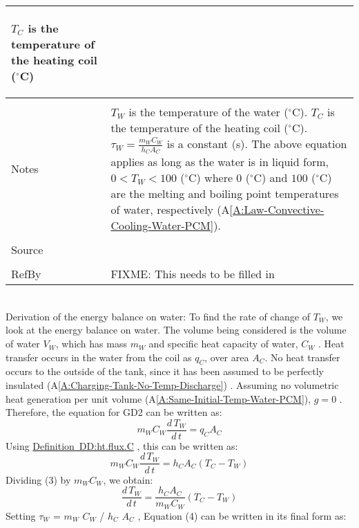 \documentclass[12pt]{article}
\begin{document}
\begin{minipage}{\textwidth}
\begin{tabular}{p{} p{}}
\begin{symbDescription}
              \item{${T_{C}}$ is the temperature of the heating coil (${}^{\circ}$C)}
              \end{symbDescription}
\\ \midrule \\
Notes & ${T_{W}}$ is the temperature of the water (${}^{\circ}$C). ${T_{C}}$ is the temperature of the heating coil (${}^{\circ}$C). ${τ_{W}}=\frac{{m_{W}} {C_{W}}}{{h_{C}} {A_{C}}}$ is a constant (s). The above equation applies as long as the water is in liquid form, $0<{T_{W}}<100$ (${}^{\circ}$C) where $0$ (${}^{\circ}$C) and $100$ (${}^{\circ}$C) are the melting and boiling point temperatures of water, respectively (A\ref{A:Law-Convective-Cooling-Water-PCM}).
\\ \midrule \\
Source & 
\\ \midrule \\
RefBy & FIXME: This needs to be filled in
\\ \bottomrule \end{tabular}
\end{minipage}\\
Derivation of the energy balance on water:
To find the rate of change of ${T_{W}}$, we look at the energy balance on water. The volume being considered is the volume of water ${V_{W}}$, which has mass ${m_{W}}$ and specific heat capacity of water, ${C_{W}}$ . Heat transfer occurs in the water from the coil as ${q_{C}}$, over area ${A_{C}}$. No heat transfer occurs to the outside of the tank, since it has been assumed to be perfectly insulated (A\ref{A:Charging-Tank-No-Temp-Discharge}) . Assuming no volumetric heat generation per unit volume (A\ref{A:Same-Initial-Temp-Water-PCM}), $g=0$ . Therefore, the equation for GD2 can be written as:
\begin{dmath}
{m_{W}} {C_{W}} \frac{d\,{T_{W}}}{d\,t}={q_{C}} {A_{C}}
\end{dmath}
Using \hyperref[DD:ht.flux.C]{Definition~DD:ht.flux.C} , this can be written as:
\begin{dmath}
{m_{W}} {C_{W}} \frac{d\,{T_{W}}}{d\,t}={h_{C}} {A_{C}} \left({T_{C}}-{T_{W}}\right)
\end{dmath}
Dividing (3) by ${m_{W}} {C_{W}}$, we obtain:
\begin{dmath}
\frac{d\,{T_{W}}}{d\,t}=\frac{{h_{C}} {A_{C}}}{{m_{W}} {C_{W}}} \left({T_{C}}-{T_{W}}\right)
\end{dmath}
Setting ${τ_{W}}$ = ${m_{W}}$ ${C_{W}}$ / ${h_{C}}$ ${A_{C}}$ , Equation (4) can be written in its final form as:
\end{document}
